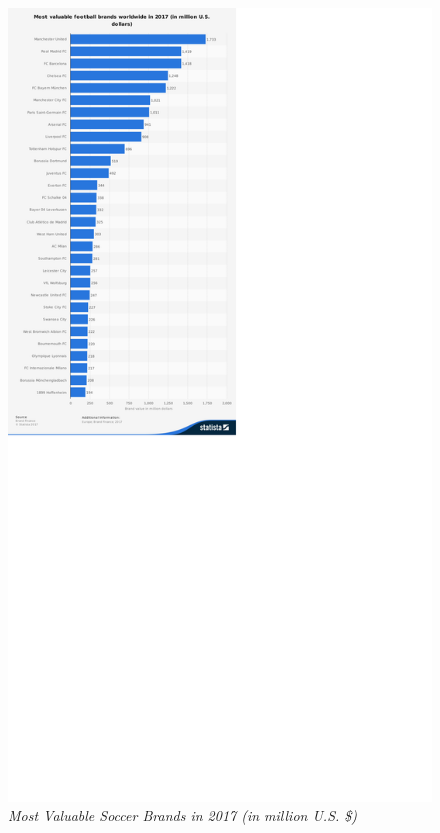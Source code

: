 \documentclass[inte,nonblindrev]{informs3} %
\begin{document}
\begin{figure}[!ht]
\centering\includegraphics[height = 1.0\textheight, width = 1.0\textwidth]{Figure3.pdf}
\caption{\textit{Most Valuable Soccer Brands in 2017 (in million U.S. \$)}}
\end{figure}
\end{document}
